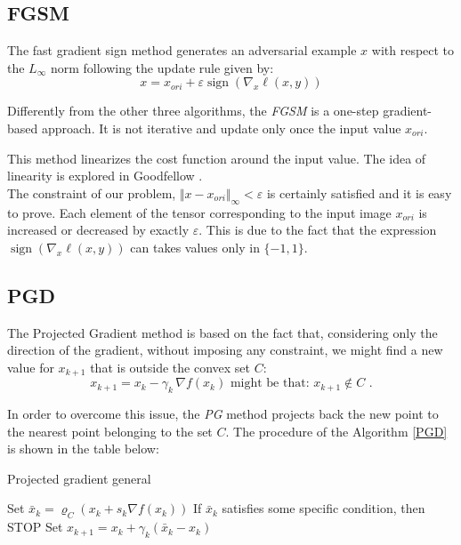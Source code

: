 \documentclass[10pt,twocolumn,letterpaper, english]{article}
\newcommand{\sign}{\mathop{\mathrm{sign}}}
\theoremstyle{definition}
\theoremstyle{plain}
\theoremstyle{plain}
\theoremstyle{plain}
\theoremstyle{plain}
\theoremstyle{remark}
\theoremstyle{remark}
\theoremstyle{definition}
\theoremstyle{definition}
\theoremstyle{definition}
\theoremstyle{definition}
\renewcommand{\epsilon}{\varepsilon}
\renewcommand{\rho}{\varrho}
\begin{document}
\subsection{FGSM}

The fast gradient sign method generates an adversarial example $x$ with respect to the $L_{\infty}$ norm following the update rule given by:
\begin{equation*}
    x= x_{ori} + \epsilon \sign (\nabla_x \ell(x,y))
\end{equation*}

Differently from the other three algorithms, the \textit{FGSM} is a one-step gradient-based approach. 
It is not iterative and update only once the input value $x_{ori}$. 

This method linearizes the cost function around the input value. The idea of linearity is explored in Goodfellow \cite{goodfellow}. \\

The constraint of our problem, $\Vert x - x_{ori} \Vert_\infty  < \epsilon$ is certainly satisfied and it is easy to prove. 
Each element of the tensor corresponding to the input image $x_{ori}$ is increased or decreased by exactly $\epsilon$. 
This is due to the fact that the expression  $\sign (\nabla_x \ell(x,y))$  can takes values only in $\{-1, 1\}$. 

\subsection{PGD}

The Projected Gradient method is based on the fact that, considering only the direction of the gradient, without imposing any constraint, we might find a new value for $x_{k+1}$ that is outside the convex set $C$: 
\begin{equation*}
    x_{k+1} = x_k - \gamma_k \, \nabla f(x_k) \text{   might be that: } x_{k+1} \notin C \,\,.
\end{equation*}

In order to overcome this issue, the \textit{PG} method projects back the new point to the nearest point belonging to the set $C$. 
The procedure of the Algorithm \ref{PGD} is shown in the table below: 

\begin{algorithm}
\caption{Projected gradient general}\label{PGD}
\begin{algorithmic}[1]
  \State Set $ \bar{x}_k = \rho_C(x_k + s_k \nabla f(x_k))$ 
  \State If $\bar{x}_k$ satisfies some specific condition, then STOP
  \State Set $x_{k+1} = x_k + \gamma_k (\bar{x}_k - x_k)$ \Comment{with $\gamma_k \in (0, 1]$}
    
\EndFor
\end{algorithmic}
\end{algorithm}
\end{document}
